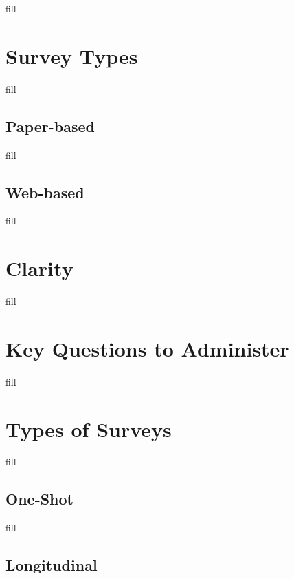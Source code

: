 \documentclass[
  b5paper]{book}
\begin{document}
fill

\hypertarget{survey-types}{%
\section{Survey Types}\label{survey-types}}

fill

\hypertarget{paper-based}{%
\subsection*{Paper-based}\label{paper-based}}

fill

\hypertarget{web-based}{%
\subsection*{Web-based}\label{web-based}}

fill

\hypertarget{clarity}{%
\section{Clarity}\label{clarity}}

fill

\hypertarget{key-questions-to-administer}{%
\section{Key Questions to Administer}\label{key-questions-to-administer}}

fill

\hypertarget{types-of-surveys}{%
\section{Types of Surveys}\label{types-of-surveys}}

fill

\hypertarget{one-shot}{%
\subsection*{One-Shot}\label{one-shot}}

fill

\hypertarget{longitudinal}{%
\subsection*{Longitudinal}\label{longitudinal}}
\end{document}
